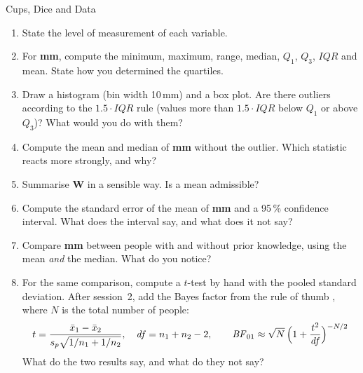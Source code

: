 \begin{uebungsblatt}{Cups, Dice and Data}
\begin{enumerate}
  \item State the level of measurement of each variable.
  \item For \textbf{mm}, compute the minimum, maximum, range, median,
    $Q_1$, $Q_3$, $\mathit{IQR}$ and mean. State how you determined the
    quartiles.
  \item Draw a histogram (bin width 10\,mm) and a box plot. Are there
    outliers according to the $1.5\cdot\mathit{IQR}$ rule (values more
    than $1.5\cdot\mathit{IQR}$ below $Q_1$ or above $Q_3$)? What would you
    do with them?
  \item Compute the mean and median of \textbf{mm} without the outlier.
    Which statistic reacts more strongly, and why?
  \item Summarise \textbf{W} in a sensible way. Is a mean admissible?
  \item Compute the standard error of the mean of \textbf{mm} and a 95\,\%
    confidence interval. What does the interval say, and what does it not
    say?
  \item Compare \textbf{mm} between people with and without prior
    knowledge, using the mean \emph{and} the median. What do you notice?
  \item For the same comparison, compute a $t$-test by hand with the
    pooled standard deviation. After session~2, add the Bayes factor from
    the rule of thumb \parencite{wagenmakers2007practical}, where $N$ is the
    total number of people:
    \[t=\frac{\bar{x}_1-\bar{x}_2}{s_p\sqrt{1/n_1+1/n_2}},\quad
      \mathit{df}=n_1+n_2-2,\qquad
      \mathit{BF}_{01}\approx\sqrt{N}\,\Bigl(1+\frac{t^2}{\mathit{df}}\Bigr)^{-N/2}\] What do the two results say, and what do they not say?
\end{enumerate}
\end{uebungsblatt}

